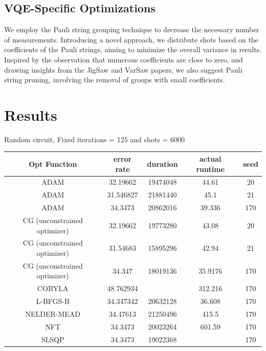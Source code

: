 \documentclass{article}
\begin{document}
\subsection{VQE-Specific Optimizations}
We employ the Pauli string grouping technique to decrease the necessary number of measurements. Introducing a novel approach, we distribute shots based on the coefficients of the Pauli strings, aiming to minimize the overall variance in results. Inspired by the observation that numerous coefficients are close to zero, and drawing insights from the JigSaw and VarSaw papers, we also suggest Pauli string pruning, involving the removal of groups with small coefficients.

\section{Results}

Random circuit, Fixed iterations = 125 and shots = 6000
\begin{center}
\scriptsize
\begin{tabular}{||c c c c c||} 
 \hline
 Opt Function & error rate & duration & actual runtime & seed \\ [0.5ex] 
 \hline\hline
ADAM & 32.19662 & 19474048 & 44.61 & 20\\
ADAM & 31.546827 & 21881440 & 45.1 & 21\\
ADAM & 34.3473 & 20862016 & 39.336 & 170\\
CG (unconstrained optimizer) & 32.19662 & 19773280 & 43.08 & 20\\
CG (unconstrained optimizer) & 31.54683 & 15895296 & 42.94 & 21\\
CG (unconstrained optimizer) & 34.347 & 18019136 & 35.9176 & 170\\
COBYLA & 48.762934 &  & 312.216 & 170\\
L-BFGS-B & 34.347342 & 20632128 & 36.608 & 170\\
NELDER-MEAD & 34.47613 & 21250496 & 415.5 & 170\\
NFT & 34.3473 & 20023264 & 601.59 & 170\\
SLSQP & 34.3473 & 19022368 & & 170 \\[1ex] 
 \hline

\end{tabular}
\end{center}
\end{document}
